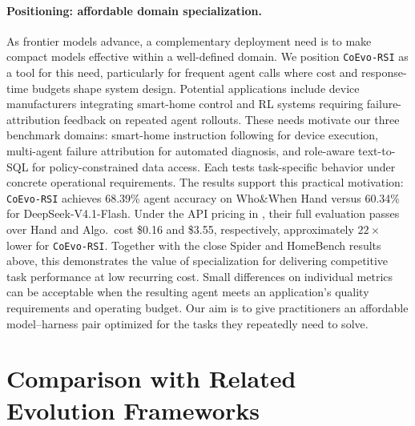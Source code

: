 \documentclass[11pt,a4paper]{article}
\newcommand{\ourmethod}{\texttt{CoEvo-RSI}}
\begin{document}
\paragraph{Positioning: affordable domain specialization.}
As frontier models advance, a complementary deployment need is to make compact models effective within a well-defined domain. We position \ourmethod{} as a tool for this need, particularly for frequent agent calls where cost and response-time budgets shape system design. Potential applications include device manufacturers integrating smart-home control and RL systems requiring failure-attribution feedback on repeated agent rollouts. These needs motivate our three benchmark domains: smart-home instruction following for device execution, multi-agent failure attribution for automated diagnosis, and role-aware text-to-SQL for policy-constrained data access. Each tests task-specific behavior under concrete operational requirements. The results support this practical motivation: \ourmethod{} achieves 68.39\% agent accuracy on Who\&When Hand versus 60.34\% for DeepSeek-V4.1-Flash. Under the API pricing in , their full evaluation passes over Hand and Algo.\ cost \$0.16 and \$3.55, respectively, approximately $22\times$ lower for \ourmethod{}. Together with the close Spider and HomeBench results above, this demonstrates the value of specialization for delivering competitive task performance at low recurring cost. Small differences on individual metrics can be acceptable when the resulting agent meets an application's quality requirements and operating budget. Our aim is to give practitioners an affordable model--harness pair optimized for the tasks they repeatedly need to solve.

\section{Comparison with Related Evolution Frameworks}
\label{app:evolution-comparison}
\end{document}
